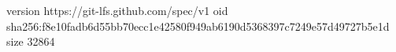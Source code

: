 version https://git-lfs.github.com/spec/v1
oid sha256:f8e10fadb6d55bb70ecc1e42580f949ab6190d5368397c7249e57d49727b5e1d
size 32864
